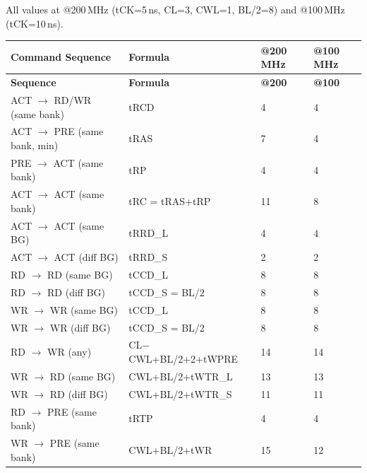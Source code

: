 \documentclass[11pt,a4paper]{article}
\begin{document}
All values at @200\,MHz (tCK=5\,ns, CL=3, CWL=1, BL/2=8) and @100\,MHz (tCK=10\,ns).

\begin{longtable}{L{4.2cm} L{5.5cm} C{2cm} C{2cm}}
\toprule
\textbf{Command Sequence} & \textbf{Formula} & \textbf{@200\,MHz} & \textbf{@100\,MHz} \\
\midrule
\endfirsthead\toprule\textbf{Sequence}&\textbf{Formula}&\textbf{@200}&\textbf{@100}\\\midrule\endhead\bottomrule\endfoot
{}
ACT $\to$ RD/WR (same bank)    & tRCD                                & 4           & 4 \\
ACT $\to$ PRE (same bank, min) & tRAS                                & 7           & 4 \\
PRE $\to$ ACT (same bank)      & tRP                                 & 4           & 4 \\
ACT $\to$ ACT (same bank)      & tRC = tRAS+tRP                      & 11          & 8 \\
ACT $\to$ ACT (same BG)        & tRRD\_L                             & 4           & 4 \\
ACT $\to$ ACT (diff BG)        & tRRD\_S                             & 2           & 2 \\
RD $\to$ RD (same BG)          & tCCD\_L                             & 8           & 8 \\
RD $\to$ RD (diff BG)          & tCCD\_S = BL/2                      & 8           & 8 \\
WR $\to$ WR (same BG)          & tCCD\_L                             & 8           & 8 \\
WR $\to$ WR (diff BG)          & tCCD\_S = BL/2                      & 8           & 8 \\
RD $\to$ WR (any)              & CL$-$CWL+BL/2+2+tWPRE              & 14          & 14 \\
WR $\to$ RD (same BG)          & CWL+BL/2+tWTR\_L                    & 13          & 13 \\
WR $\to$ RD (diff BG)          & CWL+BL/2+tWTR\_S                    & 11          & 11 \\
RD $\to$ PRE (same bank)       & tRTP                                & 4           & 4 \\
WR $\to$ PRE (same bank)       & CWL+BL/2+tWR                       & 15          & 12 \\

\end{longtable}
\end{document}
